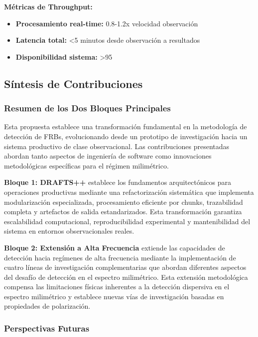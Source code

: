 \textbf{Métricas de Throughput:}
\begin{itemize}
\item \textbf{Procesamiento real-time:} 0.8-1.2x velocidad observación
\item \textbf{Latencia total:} <5 minutos desde observación a resultados
\item \textbf{Disponibilidad sistema:} >95%
\end{itemize}

\subsection{Síntesis de Contribuciones}

\subsubsection{Resumen de los Dos Bloques Principales}

Esta propuesta establece una transformación fundamental en la metodología de detección de FRBs, evolucionando desde un prototipo de investigación hacia un sistema productivo de clase observacional. Las contribuciones presentadas abordan tanto aspectos de ingeniería de software como innovaciones metodológicas específicas para el régimen milimétrico.

\textbf{Bloque 1: DRAFTS++} establece los fundamentos arquitectónicos para operaciones productivas mediante una refactorización sistemática que implementa modularización especializada, procesamiento eficiente por chunks, trazabilidad completa y artefactos de salida estandarizados. Esta transformación garantiza escalabilidad computacional, reproducibilidad experimental y mantenibilidad del sistema en entornos observacionales reales.

\textbf{Bloque 2: Extensión a Alta Frecuencia} extiende las capacidades de detección hacia regímenes de alta frecuencia mediante la implementación de cuatro líneas de investigación complementarias que abordan diferentes aspectos del desafío de detección en el espectro milimétrico. Esta extensión metodológica compensa las limitaciones físicas inherentes a la detección dispersiva en el espectro milimétrico y establece nuevas vías de investigación basadas en propiedades de polarización.

\subsubsection{Perspectivas Futuras}

